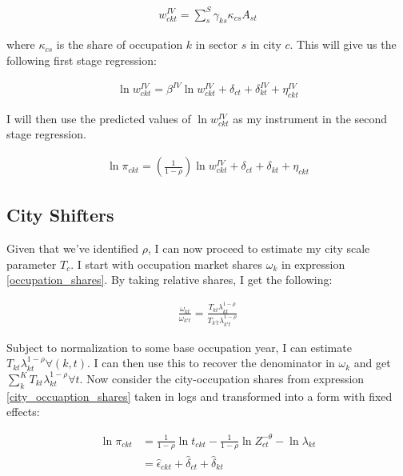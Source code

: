 \documentclass[10pt]{article}
\begin{document}
\begin{align*}
    w_{ckt}^{IV} = \sum_{s}^{S} \gamma_{ks} \kappa_{cs} A_{st}
\end{align*}

where $\kappa_{cs}$ is the  share of occupation $k$ in sector $s$ in city $c$. This will give us the following first stage regression:

\begin{align*}
    \ln w_{ckt}^{IV} = \beta^{IV} \ln w_{ckt}^{IV} + \delta_{ct} + \delta_{kt}^{IV} + \eta_{ckt}^{IV}
\end{align*}

I will then use the predicted values of $\ln w_{ckt}^{IV}$ as my instrument in the second stage regression.

\begin{align*}
    \ln \pi_{ckt} = \left( \frac{1}{1 - \rho} \right) \ln w_{ckt}^{IV} + \delta_{ct} + \delta_{kt} + \eta_{ckt}
\end{align*}

\subsection{City Shifters}

Given that we've identified $\rho$, I can now proceed to estimate my city scale parameter $T_c$. I start with occupation market shares $\omega_k$ in expression \ref{occupation_shares}. By taking relative shares, I get the following:

\begin{align*}
    \frac{\omega_{kt}}{\omega_{k't}} = \frac{T_{kt} \lambda_{kt}^{1 - \rho}}{T_{k't} \lambda_{k't}^{1 - \rho}}
\end{align*}

Subject to normalization to some base occupation year, I can estimate $T_{kt} \lambda_{kt}^{1 - \rho} \forall (k, t)$. I can then use this to recover the denominator in $\omega_k$ and get $\sum_{k}^{K} T_{kt} \lambda_{kt}^{1 - \rho} \forall t$. Now consider the city-occupation shares from expression \ref{city_occuaption_shares} taken in logs and transformed into a form with fixed effects:

\begin{align*}
    \ln \pi_{ckt} & = \frac{1}{1 - \rho} \ln t_{ckt} - \frac{1}{1 - \rho} \ln Z_{ct}^{- \theta} - \ln \lambda_{kt} \\
                  & = \hat{\epsilon}_{ckt} + \hat{\delta}_{ct} + \hat{\delta}_{kt}
\end{align*}
\end{document}
